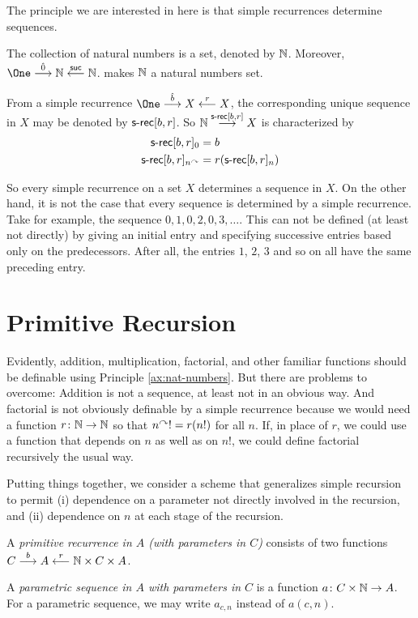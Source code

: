 The principle we are interested in here is that simple recurrences determine sequences.

\begin{principle}\label{ax:nat-numbers}
	The collection of natural numbers is a set, denoted by $\mathbb N$.
	Moreover, $\One \stackrel{\hat{0}}{\longrightarrow} \NN \stackrel{\suc}{\longleftarrow} \NN$.
	makes $\mathbb N$ a natural numbers set.
	
	From a simple recurrence $\One \stackrel{\hat{b}}{\longrightarrow} X \stackrel{r}{\longleftarrow} X$, the corresponding unique sequence in $X$
	may be denoted by $\mathord{\textsf{s-rec}}[b,r]$. So $\mathbb N\stackrel{\mathord{\textsf{s-rec}}[b,r]}{\longrightarrow}X$ is characterized by
	\begin{align*}
		\mathord{\textsf{s-rec}}[b,r]_0 &= b\\
		\mathord{\textsf{s-rec}}[b,r]_{n^\curvearrowright} &= r(\mathord{\textsf{s-rec}}[b,r]_n)
	\end{align*}
\end{principle}

So every simple recurrence on a set $X$ determines a sequence in $X$. 
On the other hand, it is not the case that every sequence is determined by a simple recurrence.
Take for example, the sequence $0,1,0,2,0,3,\ldots$. 
This can not be defined (at least not directly) by giving an initial entry and specifying successive entries based only on the predecessors. 
After all, the entries $1$, $2$, $3$ and so on all have the same preceding entry.


\section{Primitive Recursion}

Evidently, addition, multiplication, factorial, and other familiar functions should be definable using Principle \ref{ax:nat-numbers}. 
But there are problems to overcome: Addition is not a sequence, at least not in an obvious way. And factorial is not obviously definable by a simple recurrence
because we would need a function ${r}\colon{\mathbb N}\to{\mathbb N}$ so that $n^\curvearrowright! = r(n!)$
for all $n$. If, in place of $r$, we could use a function that depends on $n$ as well as on $n!$, we could define factorial recursively the usual way.

Putting things together, we consider a scheme that generalizes simple recursion to permit (i) dependence on a parameter not directly involved in the recursion, and
(ii) dependence on $n$ at each stage of the recursion.

\begin{defn}
	A \emph{primitive recurrence in $A$ (with parameters in $C$)} consists of two  functions $C\stackrel{b}{\longrightarrow} A\stackrel{r}{\longleftarrow}\mathbb N\times C\times A$.
	
	A \emph{parametric sequence in $A$ with parameters in $C$} is a function
	${a}\colon{C\times \mathbb N}\to{A}$. For a parametric sequence, we may write $a_{c,n}$
	instead of $a(c,n)$. 
\end{defn}

